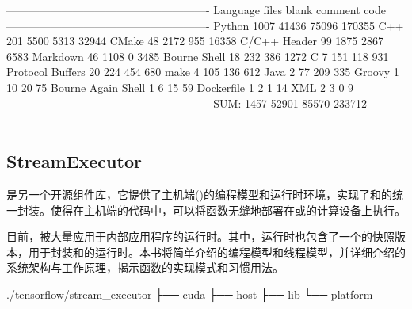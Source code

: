 \begin{content}
\begin{leftbar}
\begin{python}[caption={Contrib代码统计}]
-------------------------------------------------------
Language            files     blank   comment      code
-------------------------------------------------------
Python               1007     41436     75096    170355
C++                   201      5500      5313     32944
CMake                  48      2172       955     16358
C/C++ Header           99      1875      2867      6583
Markdown               46      1108         0      3485
Bourne Shell           18       232       386      1272
C                       7       151       118       931
Protocol Buffers       20       224       454       680
make                    4       105       136       612
Java                    2        77       209       335
Groovy                  1        10        20        75
Bourne Again Shell      1         6        15        59
Dockerfile              1         2         1        14
XML                     2         3         0         9
-------------------------------------------------------
SUM:                 1457     52901     85570    233712
-------------------------------------------------------
\end{python}
\end{leftbar}

\subsection{StreamExecutor}

是另一个开源组件库，它提供了主机端()的编程模型和运行时环境，实现了和的统一封装。使得在主机端的代码中，可以将函数无缝地部署在或的计算设备上执行。

目前，被大量应用于内部应用程序的运行时。其中，\tf{}运行时也包含了一个的快照版本，用于封装和的运行时。本书将简单介绍的编程模型和线程模型，并详细介绍的系统架构与工作原理，揭示函数的实现模式和习惯用法。

\begin{leftbar}
\begin{c++}[caption={StreamExecutor源码结构}]
./tensorflow/stream_executor
├── cuda
├── host
├── lib
└── platform
\end{c++}
\end{leftbar}


\end{content}
